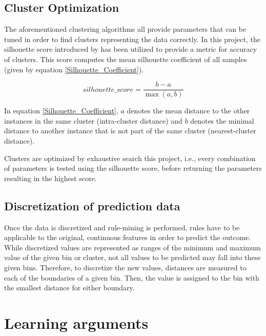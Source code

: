 \subsection*{Cluster Optimization}

The aforementioned clustering algorithms all provide parameters that can be tuned in order to find  clusters representing the data correctly. In this project, the silhouette score introduced by \citet{ROUSSEEUW198753} has been utilized to provide a metric for accuracy of clusters. This score computes the mean silhouette coefficient of all samples (given by equation \ref{Silhouette_Coefficient}).

\begin{equation}
\label{Silhouette_Coefficient}
    silhouette\_ score = \frac{b - a}{\max(a, b)}
\end{equation}

\noindent In equation \ref{Silhouette_Coefficient}, $a$ denotes the mean distance to the other instances in the same cluster (intra-cluster distance) and $b$ denotes the minimal distance to another instance that is not part of the same cluster (nearest-cluster distance).

Clusters are optimized by exhaustive search this project, i.e., every combination of parameters is tested using the silhouette score, before returning the parameters resulting in the highest score.

\subsection*{Discretization of prediction data}

Once the data is discretized and rule-mining is performed, rules have to be applicable to the original, continuous features in order to predict the outcome. While discretized values are represented as ranges of the minimum and maximum value of the given bin or cluster, not all values to be predicted may fall into these given bins. Therefore, to discretize the new values, distances are measured to each of the boundaries of a given bin. Then, the value is assigned to the bin with the smallest distance for either boundary.

\section{Learning arguments}\label{Section_Learning_Arguments}


